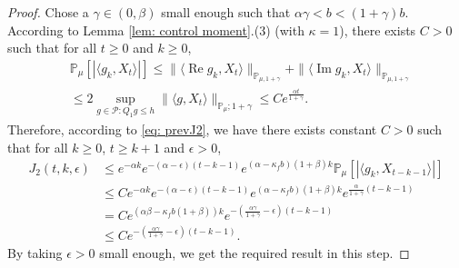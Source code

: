 \documentclass[12pt,a4paper]{amsart}
\theoremstyle{plain}
\theoremstyle{definition}
\numberwithin{equation}{section}
\begin{document}
\begin{proof}
    Chose a $\gamma\in(0,\beta)$ small enough such that $\alpha \gamma < b < (1+\gamma)b$.
    According to Lemma \ref{lem: control moment}.(3) (with $\kappa=1$), there exists $C>0$ such that for all $t\geq 0$ and $k\geq 0$,
\begin{equation}\begin{split}
    &\mathbb{P}_{\mu}\left[\left|\langle g_k,X_{t}\rangle\right|\right]
    \leq \|\langle \operatorname{Re} g_k, X_{t}\rangle\|_{\mathbb{P}_{\mu,1+\gamma}} + \|\langle \operatorname{Im} g_k, X_{t}\rangle\|_{\mathbb{P}_{\mu,1+\gamma}}
    \\& \leq 2\sup_{g\in \mathcal P: Q_1 g\leq h} \|\langle g, X_t\rangle\|_{\mathbb P_\mu; 1+\gamma} \leq C e^{\frac{\alpha t}{1+\gamma}}.
\end{split}\end{equation}
Therefore, according to \eqref{eq: prevJ2}, we have there exists constant $C>0$ such that for all $k\geq 0$, $t\geq k+1$ and $\epsilon> 0$,
\begin{equation}\begin{split}
\label{eq: right bound for J2}
    J_2(t,k, \epsilon)&
\leq  e^{-\alpha k}e^{-(\alpha-\epsilon)(t-k-1)}e^{(\alpha-\kappa_f b)(1+\beta)k} \mathbb{P}_{\mu}\left[\left|\langle g_k,X_{t-k-1}\rangle\right|\right]
    \\&\leq C e^{-\alpha k}e^{-(\alpha-\epsilon)(t-k-1)}e^{(\alpha-\kappa_f b)(1+\beta)k} e^{\frac{\alpha}{1+\gamma}(t-k-1)}
    \\&= C e^{(\alpha \beta - \kappa_f b(1+\beta))k}e^{-(\frac{\alpha\gamma}{1+\gamma}-\epsilon)(t-k-1)}
    \\&\leq C e^{-(\frac{\alpha\gamma}{1+\gamma}-\epsilon)(t-k-1)}.
\end{split}\end{equation}
    By taking $\epsilon >0$ small enough, we get the required result in this step.


\end{proof}
\end{document}
